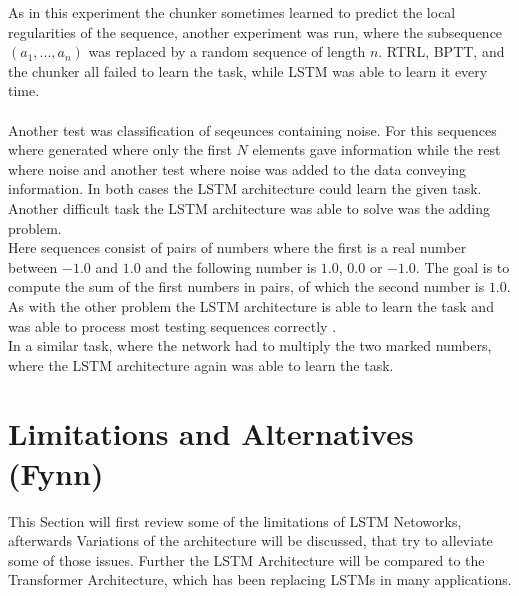 \documentclass[twoside,a4paper,10pt,DIV=12,BCOR=12mm]{scrartcl}
\begin{document}
As in this experiment the chunker sometimes learned to predict the local regularities of the sequence, another experiment was run, where the subsequence $(a_1, ..., a_n)$ was replaced by a random sequence of length $n$. RTRL, BPTT, and the chunker all failed to learn the task, while LSTM was able to learn it every time.\cite{hochreiter1997lstm}\\
\\
Another test was classification of seqeunces containing noise. For this sequences where generated where only the first $N$ elements gave information while the rest where noise and another test where noise was added to the data conveying information. In both cases the LSTM architecture could learn the given task.\cite{hochreiter1997lstm}
\\
Another difficult task the LSTM architecture was able to solve was the adding problem.\cite{hochreiter1997lstm}\\
Here sequences consist of pairs of numbers where the first is a real number between $-1.0$ and $1.0$ and the following number is $1.0$, $0.0$ or $-1.0$. The goal is to compute the sum of the first numbers in pairs, of which the second number is $1.0$. As with the other problem the LSTM architecture is able to learn the task and was able to process most testing sequences correctly . \cite{hochreiter1997lstm}\\
In a similar task, where the network had to multiply the two marked numbers, where the LSTM architecture again was able to learn the task. \cite{hochreiter1997lstm}
\section{Limitations and Alternatives (Fynn)}

This Section will first review some of the limitations of LSTM Netoworks, afterwards Variations of the architecture will be discussed, that try to alleviate some of those issues. Further the LSTM Architecture will be compared to the Transformer Architecture, which has been replacing LSTMs in many applications.
\end{document}

